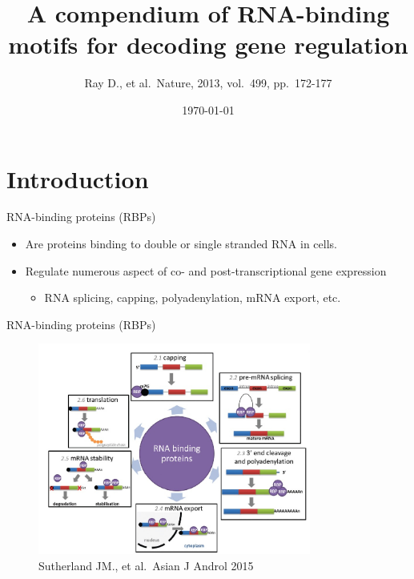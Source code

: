 \documentclass[professionalfont, 12pt, default]{beamer}
\title{A compendium of RNA-binding motifs for decoding gene regulation}
\author{Ray D., et al.~Nature, 2013, vol.~499, pp.~172-177}
\date{\today}
\providecommand{\tightlist}{%
    \setlength{\itemsep}{0pt}\setlength{\parskip}{0pt}}
\begin{document}
\frame{\titlepage}

\hypertarget{introduction}{%
\section{Introduction}\label{introduction}}

\begin{frame}{%
\protect\hypertarget{rna-binding-proteins-rbps}{%
RNA-binding proteins (RBPs)}}

\begin{itemize}
\tightlist
\item
  Are proteins binding to double or single stranded RNA in cells.
\item
  Regulate numerous aspect of co- and post-transcriptional gene
  expression

  \begin{itemize}
  \tightlist
  \item
    RNA splicing, capping, polyadenylation, mRNA export, etc.
  \end{itemize}
\end{itemize}

\end{frame}

\begin{frame}{%
\protect\hypertarget{rna-binding-proteins-rbps-1}{%
RNA-binding proteins (RBPs)}}

\begin{figure}
\centering
\includegraphics[width=0.8\textwidth,height=\textheight]{img/RBPs1.jpg}
\caption{Sutherland JM., et al.~Asian J Androl 2015}
\end{figure}

\end{frame}
\end{document}

